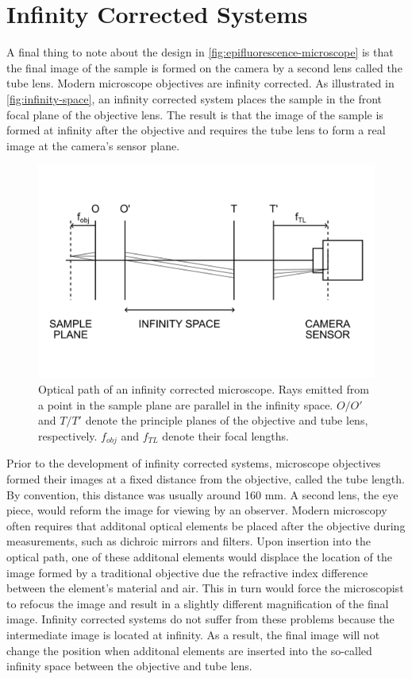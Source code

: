 \documentclass[10pt,a4paper,oneside]{book}
\begin{document}
\section{Infinity Corrected Systems}

A final thing to note about the design in \autoref{fig:epifluorescence-microscope} is that the final image of the sample is formed on the camera by a second lens called the tube lens. Modern microscope objectives are infinity corrected. As illustrated in \autoref{fig:infinity-space}, an infinity corrected system places the sample in the front focal plane of the objective lens. The result is that the image of the sample is formed at infinity after the objective and requires the tube lens to form a real image at the camera's sensor plane.

\begin{figure}[ht]
    \centering
    \includegraphics{infinity-space.png}
    \caption{Optical path of an infinity corrected microscope. Rays emitted from a point in the sample plane are parallel in the infinity space. $O/O'$ and $T/T'$ denote the principle planes of the objective and tube lens, respectively. $f_{obj}$ and $f_{TL}$ denote their focal lengths.}
    \label{fig:infinity-space}
\end{figure}

Prior to the development of infinity corrected systems, microscope objectives formed their images at a fixed distance from the objective, called the tube length. By convention, this distance was usually around 160 mm. A second lens, the eye piece, would reform the image for viewing by an observer. Modern microscopy often requires that additonal optical elements be placed after the objective during measurements, such as dichroic mirrors and filters. Upon insertion into the optical path, one of these additonal elements would displace the location of the image formed by a traditional objective due the refractive index difference between the element's material and air. This in turn would force the microscopist to refocus the image and result in a slightly different magnification of the final image. Infinity corrected systems do not suffer from these problems because the intermediate image is located at infinity. As a result, the final image will not change the position when additonal elements are inserted into the so-called infinity space between the objective and tube lens.
\end{document}
